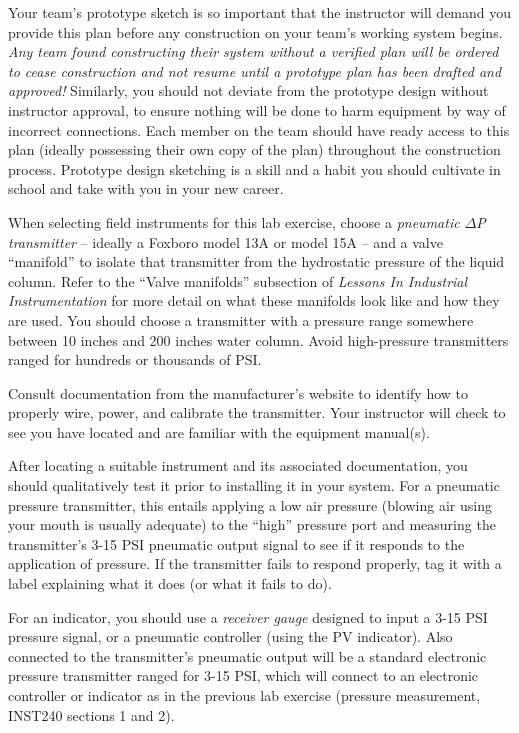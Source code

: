 Your team's prototype sketch is so important that the instructor will demand you provide this plan before any construction on your team's working system begins.  {\it Any team found constructing their system without a verified plan will be ordered to cease construction and not resume until a prototype plan has been drafted and approved!}  Similarly, you should not deviate from the prototype design without instructor approval, to ensure nothing will be done to harm equipment by way of incorrect connections.  Each member on the team should have ready access to this plan (ideally possessing their own copy of the plan) throughout the construction process.  Prototype design sketching is a skill and a habit you should cultivate in school and take with you in your new career.

\vskip 10pt

When selecting field instruments for this lab exercise, choose a {\it pneumatic $\Delta$P transmitter} -- ideally a Foxboro model 13A or model 15A -- and a valve ``manifold'' to isolate that transmitter from the hydrostatic pressure of the liquid column.  Refer to the ``Valve manifolds'' subsection of {\it Lessons In Industrial Instrumentation} for more detail on what these manifolds look like and how they are used.  You should choose a transmitter with a pressure range somewhere between 10 inches and 200 inches water column.  Avoid high-pressure transmitters ranged for hundreds or thousands of PSI.

Consult documentation from the manufacturer's website to identify how to properly wire, power, and calibrate the transmitter.  Your instructor will check to see you have located and are familiar with the equipment manual(s).

After locating a suitable instrument and its associated documentation, you should qualitatively test it prior to installing it in your system.  For a pneumatic pressure transmitter, this entails applying a low air pressure (blowing air using your mouth is usually adequate) to the ``high'' pressure port and measuring the transmitter's 3-15 PSI pneumatic output signal to see if it responds to the application of pressure.  If the transmitter fails to respond properly, tag it with a label explaining what it does (or what it fails to do).

For an indicator, you should use a {\it receiver gauge} designed to input a 3-15 PSI pressure signal, or a pneumatic controller (using the PV indicator).  Also connected to the transmitter's pneumatic output will be a standard electronic pressure transmitter ranged for 3-15 PSI, which will connect to an electronic controller or indicator as in the previous lab exercise (pressure measurement, INST240 sections 1 and 2).

